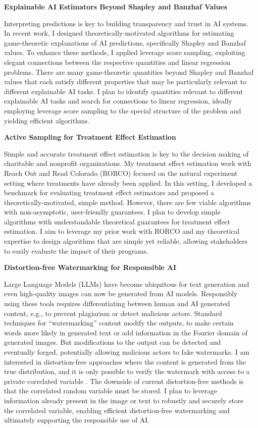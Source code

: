 \documentclass[11pt]{article}
\begin{document}
{{\large \textbf{Explainable AI Estimators Beyond Shapley and Banzhaf Values}}

Interpreting predictions is key to building transparency and trust in AI systems. In recent work, I designed theoretically-motivated algorithms for estimating game-theoretic explanations of AI predictions, specifically Shapley and Banzhaf values. To enhance these methods, I applied leverage score sampling, exploiting elegant connections between the respective quantities and linear regression problems. There are many game-theoretic quantities beyond Shapley and Banzhaf values that each satisfy different properties that may be particularly relevant to different explainable AI tasks. I plan to identify quantities relevant to different explainable AI tasks and search for connections to linear regression, ideally employing leverage score sampling to the special structure of the problem and yielding efficient algorithms.

{\large \textbf{Active Sampling for Treatment Effect Estimation}}

Simple and accurate treatment effect estimation is key to the decision making of charitable and nonprofit organizations. My treatment effect estimation work with Reach Out and Read Colorado (RORCO) focused on the natural experiment setting where treatments have already been applied. In this setting, I developed a benchmark for evaluating treatment effect estimators and proposed a theoretically-motivated, simple method. However, there are few viable algorithms with non-asymptotic, user-friendly guarantees. I plan to develop simple algorithms with understandable theoretical guarantees for treatment effect estimation. I aim to leverage my prior work with RORCO and my theoretical expertise to design algorithms that are simple yet reliable, allowing stakeholders to easily evaluate the impact of their programs.

{\large \textbf{Distortion-free Watermarking for Responsible AI}}

Large Language Models (LLMs) have become ubiquitous for text generation and even high-quality images can now be generated from AI models. Responsibly using these tools requires differentiating between human and AI generated content, e.g., to prevent plagiarism or detect malicious actors. Standard techniques for “watermarking” content modify the outputs, to make certain words more likely in generated text or add information in the Fourier domain of generated images. But modifications to the output can be detected and eventually forged, potentially allowing malicious actors to fake watermarks. I am interested in distortion-free approaches where the content is generated from the true distribution, and it is only possible to verify the watermark with access to a private correlated variable \cite{arabi2024hidden}. The downside of current distortion-free methods is that the correlated random variable must be stored. I plan to leverage information already present in the image or text to robustly and securely store the correlated variable, enabling efficient distortion-free watermarking and ultimately supporting the responsible use of AI.

}
\end{document}
